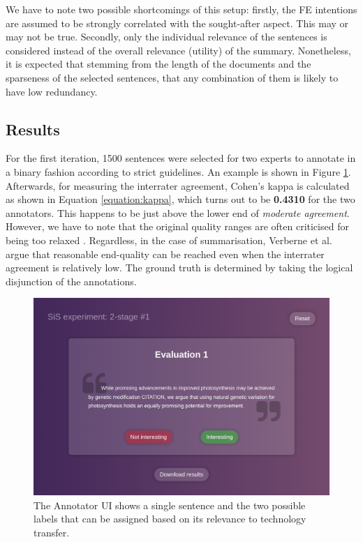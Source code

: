 We have to note two possible shortcomings of this setup: firstly, the FE intentions are assumed to be strongly correlated with the sought-after aspect. This may or may not be true. Secondly, only the individual relevance of the sentences is considered instead of the overall relevance (utility) of the summary. Nonetheless, it is expected that stemming from the length of the documents and the sparseness of the selected sentences, that any combination of them is likely to have low redundancy.

\subsection{Results}

For the first iteration, 1500 sentences were selected for two experts to annotate in a binary fashion according to strict guidelines. An example is shown in Figure \ref{fig:annotator}. Afterwards, for measuring the interrater agreement, Cohen's kappa \cite{cohen1960coefficient} is calculated as shown in Equation \ref{equation:kappa}, which turns out to be \textbf{0.4310} for the two annotators. This happens to be just above the lower end of \textit{moderate agreement}. However, we have to note that the original quality ranges are often criticised for being too relaxed \cite{mchugh2012interrater}. Regardless, in the case of summarisation, Verberne et al. \cite{verberne2018creating} argue that reasonable end-quality can be reached even when the interrater agreement is relatively low. The ground truth is determined by taking the logical disjunction of the annotations.

\begin{figure}
    \centering
    \includegraphics[width=0.75\linewidth]{figures/annotator.png}
    \captionsetup{width=.9\linewidth}
    \caption{The Annotator UI shows a single sentence and the two possible labels that can be assigned based on its relevance to technology transfer.}
    \label{fig:annotator}
\end{figure}

